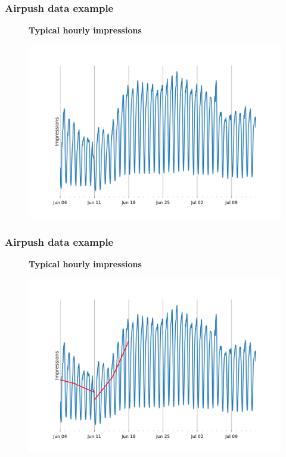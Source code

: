 \documentclass[intlimits, 9pt, unicode]{beamer}
\begin{document}
\begin{frame}
\frametitle{Airpush data example}
\begin{figure}
\textbf{Typical hourly impressions}\par\medskip
\includegraphics[scale=0.30]{images/examples_month}
\end{figure}
\end{frame}

\begin{frame}
\frametitle{Airpush data example}
\begin{figure}
\textbf{Typical hourly impressions}\par\medskip
\includegraphics[scale=0.30]{images/examples_month_2}
\end{figure}
\end{frame}
\end{document}
